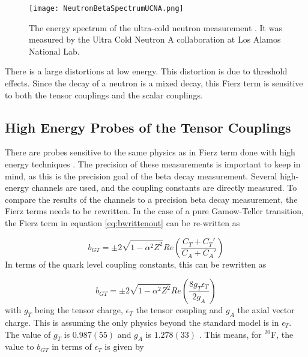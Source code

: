 \documentclass[../MaxHughesThesis.tex]{subfiles}
\begin{document}
\begin{figure}[!htb]
        \centerline{\texttt{[image: NeutronBetaSpectrumUCNA.png]}}
        \caption{The energy spectrum of the ultra-cold neutron measurement \cite{Hic17}.
        	 It was measured by the Ultra Cold Neutron A collaboration at Los Alamos National Lab.}
	\label{fig:ucnabeta}
\end{figure}

There is a large distortions at low energy.
This distortion is due to threshold effects.
Since the decay of a neutron is a mixed decay, this Fierz term is sensitive to both the tensor couplings and the scalar couplings.

\subsection{High Energy Probes of the Tensor Couplings} 

There are probes sensitive to the same physics as in Fierz term done with high energy techniques \cite{Gon19}.
The precision of these measurements is important to keep in mind, as this is the precision goal of the beta decay measurement.
Several high-energy channels are used, and the coupling constants are directly measured.
To compare the results of the channels to a precision beta decay measurement, the Fierz terms needs to be rewritten.
In the case of a pure Gamow-Teller transition, the Fierz term in equation \ref{eq:bwrittenout} can be re-written as %

\begin{equation}
	b_{GT} = \pm 2 \sqrt{1 - \alpha^{2} Z^{2}} Re \left(\frac{C_{T} + C_{T}'}{C_{A} + C_{A}'}\right)
	\label{eq:bgt}
\end{equation}
In terms of the quark level coupling constants, this can be rewritten as \cite{Gon19} %

\begin{equation}
	b_{GT} = \pm 2 \sqrt{1 - \alpha^{2} Z^{2}} Re \left(\frac{8 g_{T} \epsilon_{T}}{2 g_{A}}\right)
	\label{eq:bgtquarklevel}
\end{equation}
with $g_{T}$ being the tensor charge, $\epsilon_{T}$ the tensor coupling and $g_{A}$ the axial vector charge.
This is assuming the only physics beyond the standard model is in $\epsilon_{T}$.
The value of $g_{T}$ is $0.987(55)$ and $g_{A}$ is  $1.278 (33)$ \cite{Gon19}.
This means, for $^{20}$F, the value to $b_{GT}$ in terms of $\epsilon_{T}$ is given by %
\end{document}
